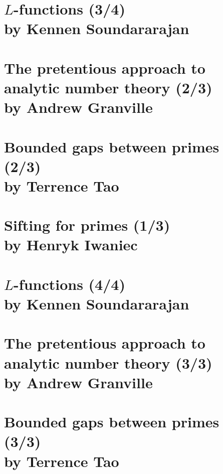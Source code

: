 \documentclass[12pt,amsfont]{amsart}
\begin{document}
\newpage
\renewcommand{\thesubsection}{\arabic{section}.\arabic{subsection}}
\section{$L$-functions (3/4)\\by Kennen Soundararajan}\label{3}

\newpage
\renewcommand{\thesubsection}{\arabic{section}.\arabic{subsection}}
\section{The pretentious approach to analytic number theory (2/3)\\ by Andrew Granville}\label{5}


\newpage
\renewcommand{\thesubsection}{\arabic{section}.\arabic{subsection}}
\section{Bounded gaps between primes (2/3)\\ by Terrence Tao}\label{4}

\newpage
\renewcommand{\thesubsection}{\arabic{section}.\arabic{subsection}}
\section{Sifting for primes (1/3)\\ by Henryk Iwaniec}\label{5}

\newpage
\section{$L$-functions (4/4)\\by Kennen Soundararajan}\label{1}


\newpage
\renewcommand{\thesubsection}{\arabic{section}.\arabic{subsection}}
\section{The pretentious approach to analytic number theory (3/3)\\ by Andrew Granville}\label{2}


\newpage
\renewcommand{\thesubsection}{\arabic{section}.\arabic{subsection}}
\section{Bounded gaps between primes (3/3)\\ by Terrence Tao}\label{13}
\end{document}
